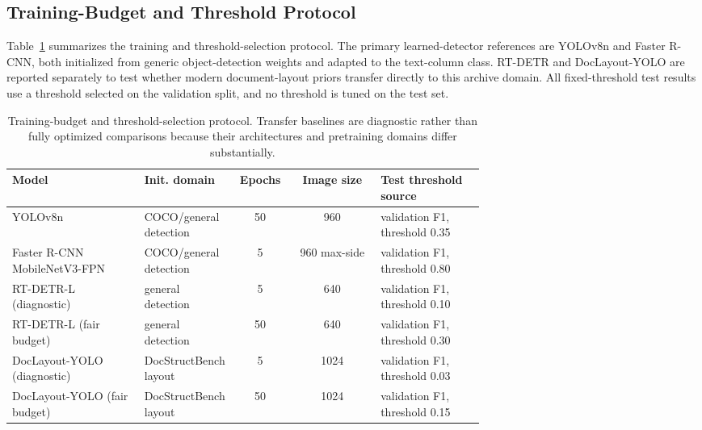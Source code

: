 \documentclass[pdflatex,sn-mathphys-num]{sn-jnl}
\begin{document}
\subsection{Training-Budget and Threshold Protocol}
Table~\ref{tab:training_protocol} summarizes the training and threshold-selection protocol. The primary learned-detector references are YOLOv8n and Faster R-CNN, both initialized from generic object-detection weights and adapted to the text-column class. RT-DETR and DocLayout-YOLO are reported separately to test whether modern document-layout priors transfer directly to this archive domain. All fixed-threshold test results use a threshold selected on the validation split, and no threshold is tuned on the test set.

\begin{table}[t]
\centering
\scriptsize\setlength{\tabcolsep}{3pt}
\caption{Training-budget and threshold-selection protocol. Transfer baselines are diagnostic rather than fully optimized comparisons because their architectures and pretraining domains differ substantially.}
\label{tab:training_protocol}
\begin{tabular}{p{0.28\linewidth}p{0.18\linewidth}ccp{0.22\linewidth}}
\toprule
Model & Init. domain & Epochs & Image size & Test threshold source \\
\midrule
YOLOv8n & COCO/general detection & 50 & 960 & validation F1, threshold 0.35 \\
Faster R-CNN MobileNetV3-FPN & COCO/general detection & 5 & 960 max-side & validation F1, threshold 0.80 \\
RT-DETR-L (diagnostic) & general detection & 5 & 640 & validation F1, threshold 0.10 \\
RT-DETR-L (fair budget) & general detection & 50 & 640 & validation F1, threshold 0.30 \\
DocLayout-YOLO (diagnostic) & DocStructBench layout & 5 & 1024 & validation F1, threshold 0.03 \\
DocLayout-YOLO (fair budget) & DocStructBench layout & 50 & 1024 & validation F1, threshold 0.15 \\
\bottomrule
\end{tabular}
\end{table}
\end{document}
